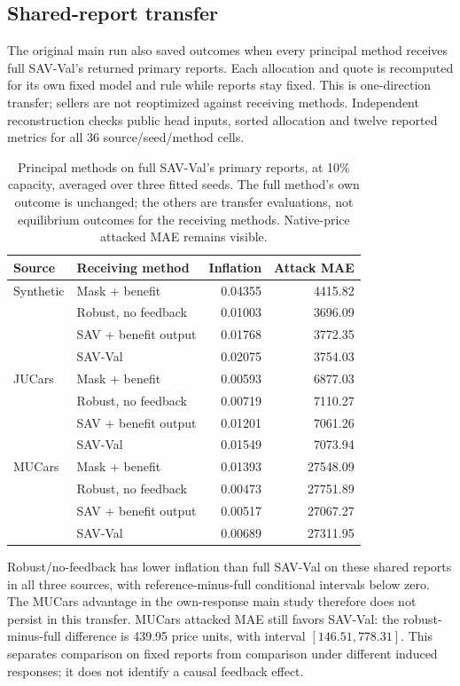 \subsection{Shared-report transfer}
The original main run also saved outcomes when every principal method
receives full SAV-Val's returned primary reports. Each allocation and quote
is recomputed for its own fixed model and rule while reports stay fixed.
This is one-direction transfer; sellers are not reoptimized against receiving
methods. Independent reconstruction checks public head inputs, sorted
allocation and twelve reported metrics for all 36 source/seed/method cells.

\begin{table}[t]
\centering
\caption{Principal methods on full SAV-Val's primary reports, at 10\%
capacity, averaged over three fitted seeds. The full method's own outcome
is unchanged; the others are transfer evaluations, not equilibrium outcomes
for the receiving methods. Native-price attacked MAE remains visible.}
\label{tab:shared_reports}
\begin{tabular}{llrr}
\toprule
Source & Receiving method & Inflation & Attack MAE\\
\midrule
Synthetic & Mask + benefit & 0.04355 & 4415.82\\
 & Robust, no feedback & 0.01003 & 3696.09\\
 & SAV + benefit output & 0.01768 & 3772.35\\
 & SAV-Val & 0.02075 & 3754.03\\
\midrule
JUCars & Mask + benefit & 0.00593 & 6877.03\\
 & Robust, no feedback & 0.00719 & 7110.27\\
 & SAV + benefit output & 0.01201 & 7061.26\\
 & SAV-Val & 0.01549 & 7073.94\\
\midrule
MUCars & Mask + benefit & 0.01393 & 27548.09\\
 & Robust, no feedback & 0.00473 & 27751.89\\
 & SAV + benefit output & 0.00517 & 27067.27\\
 & SAV-Val & 0.00689 & 27311.95\\
\bottomrule
\end{tabular}
\end{table}

Robust/no-feedback has lower inflation than full SAV-Val on these shared
reports in all three sources, with reference-minus-full conditional intervals
below zero. The MUCars advantage in the own-response main study therefore
does not persist in this transfer. MUCars attacked MAE still favors SAV-Val:
the robust-minus-full difference is 439.95 price units, with interval
$[146.51,778.31]$. This separates comparison on fixed reports from comparison
under different induced responses; it does not identify a causal feedback effect.

